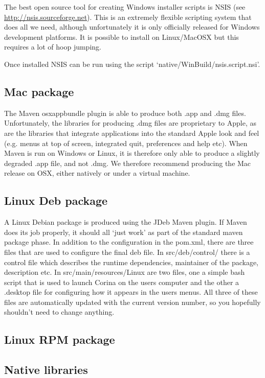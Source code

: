 The best open source tool for creating Windows installer scripts is NSIS (see \url{http://nsis.sourceforge.net}).  This is an extremely flexible scripting system that does all we need, although unfortunately it is only officially released for Windows development platforms.  It is possible to install on Linux/MacOSX but this requires a lot of hoop jumping.  

Once installed NSIS can be run using the script `native/WinBuild/nsis.script.nsi'.

\subsection{Mac package}
The Maven osxappbundle plugin is able to produce both .app and .dmg files.  Unfortunately, the libraries for producing .dmg files are proprietary to Apple, as are the libraries that integrate applications into the standard Apple look and feel (e.g. menus at top of screen, integrated quit, preferences and help etc).  When Maven is run on Windows or Linux, it is therefore only able to produce a slightly degraded .app file, and not .dmg.  We therefore recommend producing the Mac release on OSX, either natively or under a virtual machine.


\subsection{Linux Deb package}
A Linux Debian package is produced using the JDeb Maven plugin.  If Maven does its job properly, it should all `just work' as part of the standard maven package phase.  In addition to the configuration in the pom.xml, there are three files that are used to configure the final deb file.  In src/deb/control/ there is a control file which describes the runtime dependencies, maintainer of the package, description etc.  In src/main/resources/Linux are two files, one a simple bash script that is used to launch Corina on the users computer and the other a .desktop file for configuring how it appears in the users menus.  All three of these files are automatically updated with the current version number, so you hopefully shouldn't need to change anything. 


\subsection{Linux RPM package}

\subsection{Native libraries}


